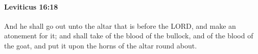 
		\paragraph{Leviticus 16:18} %
			\label{LEVITICUS-16-18}

			And he shall go out unto the altar that is before the LORD, and make an atonement for it; and shall take of the blood of the bullock, and of the blood of the goat, and put it upon the horns of the altar round about.



